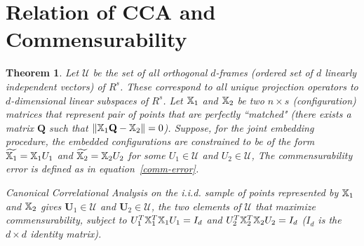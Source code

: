 \documentclass[12pt,oneside,final]{thesis}
\newtheorem{thm}{Theorem}
\begin{document}
\section{Relation of CCA and Commensurability} 

\begin{thm}
Let $ \mathcal{U}$ be the set of all orthogonal $d$-frames 
(ordered set of $d$ linearly independent vectors) of $R^{s}$. These correspond to all unique projection operators to $d$-dimensional linear subspaces of  $R^{s}$.
Let $\mathbb{X}_1$ and $\mathbb{X}_2$ be two $n\times s$ (configuration) matrices that represent pair of points that are perfectly ``matched"
 (there exists a  matrix $\mathbf{Q}$ such that $\|   \mathbb{X}_1\mathbf{Q}  -\mathbb{X}_2 \|=0$).
 Suppose, for the joint embedding procedure, the embedded configurations are constrained to be of the form $\widetilde{\mathbb{X}_1}=\mathbb{X}_1U_1$ and $\widetilde{\mathbb{X}_2}=\mathbb{X}_2U_2$ for some  $U_1\in \mathcal{U}$ and $U_2\in  \mathcal{U}$,
The commensurability error is  defined as
in equation~\eqref{comm-error}.
 
 Canonical Correlational Analysis on the  \emph{i.i.d.} sample of points represented by  $\mathbb{X}_1$ and $\mathbb{X}_2$ gives $\mathbf{U}_1\in\mathcal{U}$ and  $\mathbf{U}_2\in\mathcal{U}$, 
 the two elements of $\mathcal{U}$ that maximize commensurability, subject to $U_1^{T}\mathbb{X}_1^{T}\mathbb{X}_1U_1=I_d$ and $U_2^{T}\mathbb{X}_2^{T}\mathbb{X}_2U_2=I_d$ ($I_d$ is the $d \times d$ identity matrix).
\end{thm}
\end{document}
